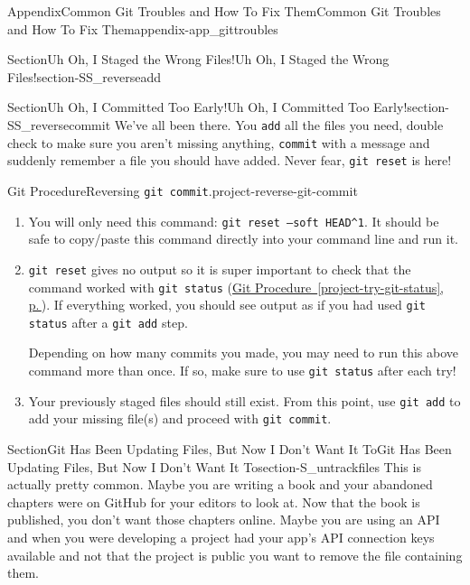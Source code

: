\documentclass[twoside,10pt,]{book}
\newcommand{\xreffont}{\relax}
\newcommand{\mono}[1]{\texttt{#1}}
\begin{document}
\begin{appendixptx}{Appendix}{Common Git Troubles and How To Fix Them}{}{Common Git Troubles and How To Fix Them}{}{}{appendix-app_gittroubles}
\begin{sectionptx}{Section}{Uh Oh, I Staged the Wrong Files!}{}{Uh Oh, I Staged the Wrong Files!}{}{}{section-SS_reverseadd}
\end{sectionptx}
%
%
\typeout{************************************************}
\typeout{************************************************}
%
\begin{sectionptx}{Section}{Uh Oh, I Committed Too Early!}{}{Uh Oh, I Committed Too Early!}{}{}{section-SS_reversecommit}
%
%
We've all been there. You \mono{add} all the files you need, double check to make sure you aren't missing anything, \mono{commit} with a message and suddenly remember a file you should have added. Never fear, \mono{git reset} is here!%
\begin{project}{Git Procedure}{Reversing \mono{git commit}.}{project-reverse-git-commit}%
\begin{enumerate}[font=\bfseries,label=(\alph*),ref=\alph*]%
\item{}You will only need this command: \mono{git reset --soft HEAD\textasciicircum{}1}. It should be safe to copy\slash{}paste this command directly into your command line and run it.%
\item{}\mono{git reset} gives no output so it is super important to check that the command worked with \mono{git status} (\hyperref[project-try-git-status]{Git Procedure~{\xreffont\ref{project-try-git-status}}, p.\,\pageref{project-try-git-status}}). If everything worked, you should see output as if you had used \mono{git status} after a \mono{git add} step.%
\par
Depending on how many commits you made, you may need to run this above command more than once. If so, make sure to use \mono{git status} after each try!%
\item{}Your previously staged files should still exist. From this point, use \mono{git add} to add your missing file(s) and proceed with \mono{git commit}.%
\end{enumerate}%
\end{project}%
\end{sectionptx}
%
%
\typeout{************************************************}
\typeout{************************************************}
%
\begin{sectionptx}{Section}{Git Has Been Updating Files, But Now I Don't Want It To}{}{Git Has Been Updating Files, But Now I Don't Want It To}{}{}{section-S_untrackfiles}
%
%
This is actually pretty common. Maybe you are writing a book and your abandoned chapters were on GitHub for your editors to look at. Now that the book is published, you don't want those chapters online. Maybe you are using an API and when you were developing a project had your app's API connection keys available and not that the project is public you want to remove the file containing them.%

\end{sectionptx}
\end{appendixptx}
\end{document}
